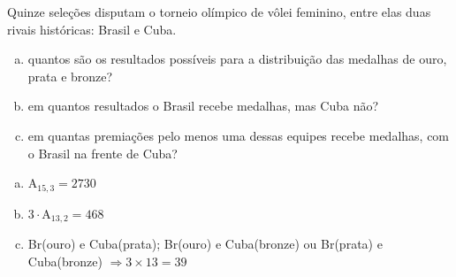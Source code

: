 \begin{ex}
Quinze seleções disputam o torneio olímpico de vôlei feminino, entre elas duas rivais históricas: Brasil e Cuba.
   \begin{enumerate}[(a)]
   \item quantos são os resultados possíveis para a distribuição das medalhas de ouro, prata e bronze?
   \item em quantos resultados o Brasil recebe medalhas, mas Cuba não?
   \item em quantas premiações pelo menos uma dessas equipes recebe medalhas, com o Brasil na frente de Cuba?
   \end{enumerate}
     \begin{sol}
     \phantom{A}
       \begin{enumerate} [(a)]
           \item $\mathrm{A}_{{15},{3}}=2730$
           \item $3\cdot \mathrm{A}_{{13},2}=468$
           \item Br(ouro) e Cuba(prata); Br(ouro) e Cuba(bronze) ou Br(prata) e Cuba(bronze) $\Longrightarrow 3 \times 13 = 39$
       \end{enumerate}
     \end{sol}
\end{ex}